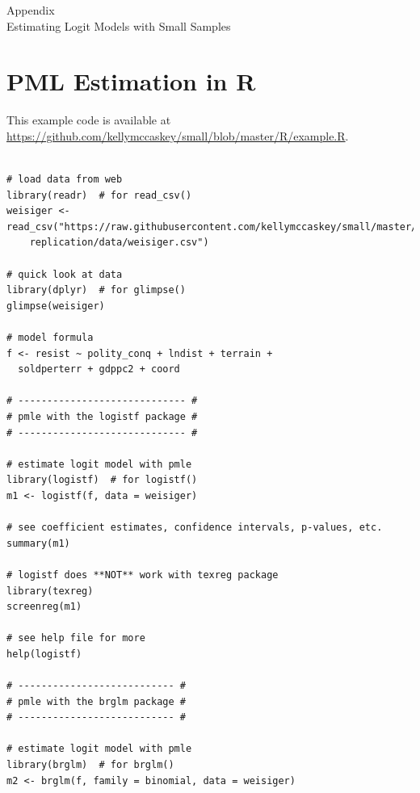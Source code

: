 \documentclass[12pt]{article}
\begin{document}
\singlespace
\normalsize


%

\newpage
\begin{appendix}
\begin{center}
{\LARGE Appendix}\\
\vspace{3mm}
{\large Estimating Logit Models with Small Samples}\\\vspace{2mm}
\end{center}

\section{PML Estimation in R}\label{sec:pmle-in-R}

This example code is available at \href{https://github.com/kellymccaskey/small/blob/master/R/example.R}{https://github.com/kellymccaskey/small/blob/master/R/example.R}.

\begin{footnotesize}
\begin{verbatim}

# load data from web
library(readr)  # for read_csv()
weisiger <- read_csv("https://raw.githubusercontent.com/kellymccaskey/small/master/weisiger-
	replication/data/weisiger.csv")

# quick look at data
library(dplyr)  # for glimpse()
glimpse(weisiger)

# model formula
f <- resist ~ polity_conq + lndist + terrain +
  soldperterr + gdppc2 + coord

# ----------------------------- #
# pmle with the logistf package #
# ----------------------------- #

# estimate logit model with pmle
library(logistf)  # for logistf()
m1 <- logistf(f, data = weisiger)

# see coefficient estimates, confidence intervals, p-values, etc.
summary(m1)

# logistf does **NOT** work with texreg package
library(texreg)
screenreg(m1)

# see help file for more
help(logistf)

# --------------------------- #
# pmle with the brglm package #
# --------------------------- #

# estimate logit model with pmle
library(brglm)  # for brglm()
m2 <- brglm(f, family = binomial, data = weisiger)


\end{verbatim}
\end{footnotesize}
\end{appendix}
\end{document}
